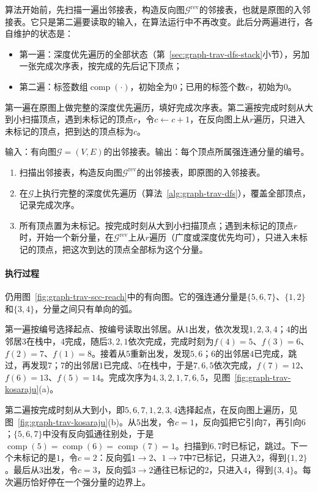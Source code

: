 算法开始前，先扫描一遍出邻接表，构造反向图$\mathcal G^{\mathrm{rev}}$的邻接表，也就是原图的入邻接表。它只是第二遍要读取的输入，在算法运行中不再改变。此后分两遍进行，各自维护的状态是：
\begin{itemize}
  \item 第一遍：深度优先遍历的全部状态（第~\ref{sec:graph-trav-dfs-stack}小节），另加一张完成次序表，按完成的先后记下顶点；
  \item 第二遍：标签数组$\operatorname{comp}(\cdot)$，初始全为$0$；已用的标签个数$c$，初始为$0$。
\end{itemize}
第一遍在原图上做完整的深度优先遍历，填好完成次序表。第二遍按完成时刻从大到小扫描顶点，遇到未标记的顶点$r$，令$c\gets c+1$，在反向图上从$r$遍历，只进入未标记的顶点，把到达的顶点标为$c$。

\begin{algorithm}[Kosaraju强连通分量算法]
\label{alg:graph-trav-kosaraju}
输入：有向图$\mathcal G=(V,E)$的出邻接表。输出：每个顶点所属强连通分量的编号。
\begin{enumerate}
  \item 扫描出邻接表，构造反向图$\mathcal G^{\mathrm{rev}}$的出邻接表，即原图的入邻接表。
  \item 在$\mathcal G$上执行完整的深度优先遍历（算法~\ref{alg:graph-trav-dfs}），覆盖全部顶点，记录完成次序。
  \item 所有顶点置为未标记。按完成时刻从大到小扫描顶点；遇到未标记的顶点$r$时，开始一个新分量，在$\mathcal G^{\mathrm{rev}}$上从$r$遍历（广度或深度优先均可），只进入未标记的顶点，把这次到达的顶点全部标为这个分量。
\end{enumerate}
\end{algorithm}

\paragraph{执行过程}
仍用图~\ref{fig:graph-trav-scc-reach}中的有向图。它的强连通分量是$\{5,6,7\}$、$\{1,2\}$和$\{3,4\}$，分量之间只有单向的弧。

第一遍按编号选择起点、按编号读取出邻居。从$1$出发，依次发现$1,2,3,4$；$4$的出邻居$3$在栈中，$4$完成，随后$3,2,1$依次完成，完成时刻为$f(4)=5$、$f(3)=6$、$f(2)=7$、$f(1)=8$。接着从$5$重新出发，发现$5,6$；$6$的出邻居$4$已完成，跳过，再发现$7$；$7$的出邻居$1$已完成、$5$在栈中，于是$7,6,5$依次完成，$f(7)=12$、$f(6)=13$、$f(5)=14$。完成次序为$4,3,2,1,7,6,5$，见图~\ref{fig:graph-trav-kosaraju}(a)。

第二遍按完成时刻从大到小，即$5,6,7,1,2,3,4$选择起点，在反向图上遍历，见图~\ref{fig:graph-trav-kosaraju}(b)。从$5$出发，令$c=1$，反向弧把它引向$7$，再引向$6$；$\{5,6,7\}$中没有反向弧通往别处，于是$\operatorname{comp}(5)=\operatorname{comp}(6)=\operatorname{comp}(7)=1$。扫描到$6,7$时已标记，跳过。下一个未标记的是$1$，令$c=2$：反向弧$1\to2$、$1\to7$中$7$已标记，只进入$2$，得到$\{1,2\}$。最后从$3$出发，令$c=3$，反向弧$3\to2$通往已标记的$2$，只进入$4$，得到$\{3,4\}$。每次遍历恰好停在一个强分量的边界上。


